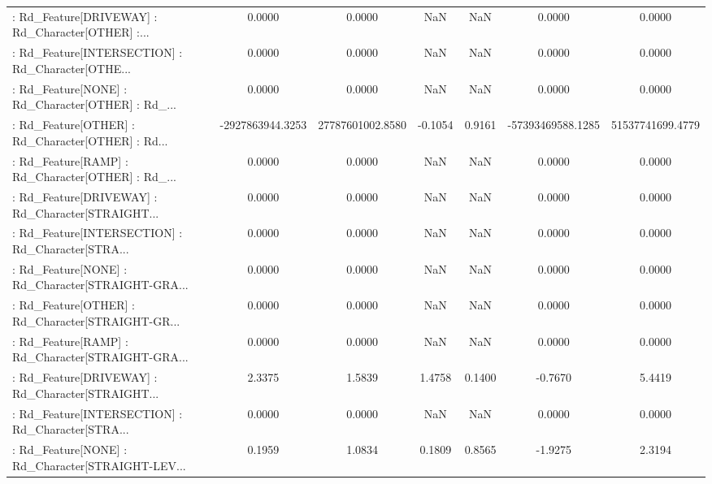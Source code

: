 \begin{longtable}{p{4cm}cccccc}
 : Rd\_Feature[DRIVEWAY] : Rd\_Character[OTHER] :... &            0.0000 &            0.0000 &     NaN &          NaN &             0.0000 &            0.0000 \\
 : Rd\_Feature[INTERSECTION] : Rd\_Character[OTHE... &            0.0000 &            0.0000 &     NaN &          NaN &             0.0000 &            0.0000 \\
 : Rd\_Feature[NONE] : Rd\_Character[OTHER] : Rd\_... &            0.0000 &            0.0000 &     NaN &          NaN &             0.0000 &            0.0000 \\
 : Rd\_Feature[OTHER] : Rd\_Character[OTHER] : Rd... &  -2927863944.3253 &  27787601002.8580 & -0.1054 &       0.9161 &  -57393469588.1285 &  51537741699.4779 \\
 : Rd\_Feature[RAMP] : Rd\_Character[OTHER] : Rd\_... &            0.0000 &            0.0000 &     NaN &          NaN &             0.0000 &            0.0000 \\
 : Rd\_Feature[DRIVEWAY] : Rd\_Character[STRAIGHT... &            0.0000 &            0.0000 &     NaN &          NaN &             0.0000 &            0.0000 \\
 : Rd\_Feature[INTERSECTION] : Rd\_Character[STRA... &            0.0000 &            0.0000 &     NaN &          NaN &             0.0000 &            0.0000 \\
 : Rd\_Feature[NONE] : Rd\_Character[STRAIGHT-GRA... &            0.0000 &            0.0000 &     NaN &          NaN &             0.0000 &            0.0000 \\
 : Rd\_Feature[OTHER] : Rd\_Character[STRAIGHT-GR... &            0.0000 &            0.0000 &     NaN &          NaN &             0.0000 &            0.0000 \\
 : Rd\_Feature[RAMP] : Rd\_Character[STRAIGHT-GRA... &            0.0000 &            0.0000 &     NaN &          NaN &             0.0000 &            0.0000 \\
 : Rd\_Feature[DRIVEWAY] : Rd\_Character[STRAIGHT... &            2.3375 &            1.5839 &  1.4758 &       0.1400 &            -0.7670 &            5.4419 \\
 : Rd\_Feature[INTERSECTION] : Rd\_Character[STRA... &            0.0000 &            0.0000 &     NaN &          NaN &             0.0000 &            0.0000 \\
 : Rd\_Feature[NONE] : Rd\_Character[STRAIGHT-LEV... &            0.1959 &            1.0834 &  0.1809 &       0.8565 &            -1.9275 &            2.3194 \\

\end{longtable}
